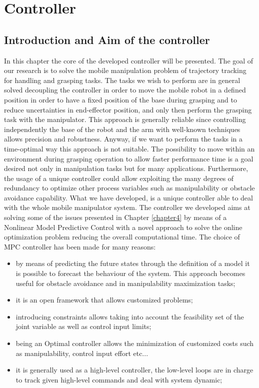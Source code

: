 
\chapter{Controller}
\label{chapter5}

\section{Introduction and Aim of the controller}

In this chapter the core of the developed controller will be presented. The goal of our research is to solve the mobile manipulation problem of trajectory tracking for handling and grasping tasks. The tasks we wish to perform are in general solved decoupling the controller in order to move the mobile robot in a defined position in order to have a fixed position of the base during grasping and to reduce uncertainties in end-effector position, and only then perform the grasping task with the manipulator. This approach is generally reliable since controlling independently the base of the robot and the arm with well-known techniques allows precision and robustness. Anyway, if we want to perform the tasks in a time-optimal way this approach is not suitable. The possibility to move within an environment during grasping operation to allow faster performance time is a goal desired not only in manipulation tasks but for many applications. Furthermore, the usage of a unique controller could allow exploiting the many degrees of redundancy to optimize other process variables such as manipulability or obstacle avoidance capability. What we have developed, is a unique controller able to deal with the whole mobile manipulator system. The controller we developed aims at solving some of the issues presented in Chapter \ref{chapter4} by means of a Nonlinear Model Predictive Control with a novel approach to solve the online optimization problem reducing the overall computational time. The choice of MPC controller has been made for many reasons: 

\begin{itemize}
\item by means of predicting the future states through the definition of a model it is possible to forecast the behaviour of the system. This approach becomes useful for obstacle avoidance and in manipulability maximization tasks;
\item it is an open framework that allows customized problems;
\item introducing constraints allows taking into account the feasibility set of the joint variable as well as control input limits;
\item being an Optimal controller allows the minimization of customized costs such as manipulability, control input effort etc...
\item it is generally used as a high-level controller, the low-level loops are in charge to track given high-level commands and deal with system dynamic;
\end{itemize}

